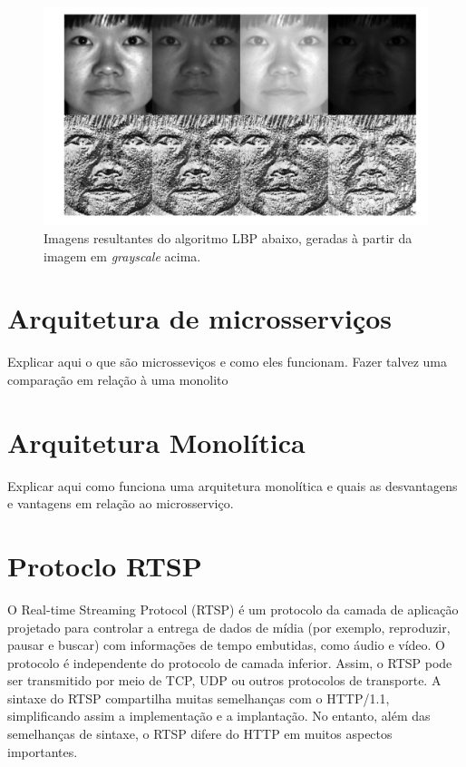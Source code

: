 \documentclass[12pt, %
openright, 
oneside, %
a4paper,    %
brazil]{facom-ufu-abntex2}
\begin{document}
\begin{figure}[!ht]
	\centering
	\includegraphics[width=0.7\linewidth]{grayscale.PNG}
	\caption[De \emph{grayscale} para LBP
	]{Imagens resultantes do algoritmo LBP abaixo, geradas à partir da imagem em \emph{grayscale} acima.}
	\label{fig:graficosVariandoTamanhoRede}
\end{figure}

\section{Arquitetura de microsserviços}

Explicar aqui o que são microsseviços e como eles funcionam. Fazer talvez uma
comparação em relação à uma monolito

\section{Arquitetura Monolítica}

Explicar aqui como funciona uma arquitetura monolítica e quais as desvantagens
e vantagens em relação ao microsserviço.

\section{Protoclo RTSP}

O Real-time Streaming Protocol (RTSP) é um protocolo da camada de aplicação
projetado para controlar a entrega de dados de mídia (por exemplo, reproduzir,
pausar e buscar) com informações de tempo embutidas, como áudio e vídeo. O
protocolo é independente do protocolo de camada inferior. Assim, o RTSP pode
ser transmitido por meio de TCP, UDP ou outros protocolos de transporte. A
sintaxe do RTSP compartilha muitas semelhanças com o HTTP/1.1, simplificando
assim a implementação e a implantação. No entanto, além das semelhanças de
sintaxe, o RTSP difere do HTTP em muitos aspectos importantes.
\end{document}
